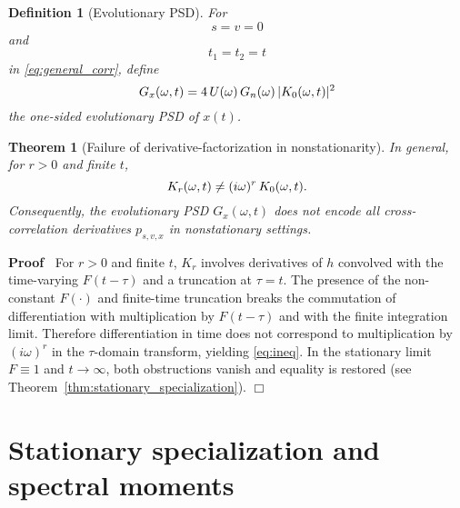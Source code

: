 \documentclass{article}
\newcommand{\cdummy}{\cdot}
\newenvironment{proof}{\noindent\textbf{Proof\ }}{\hspace*{\fill}$\Box$\medskip}
\newtheorem{definition}{Definition}
\newtheorem{theorem}{Theorem}
\begin{document}
\begin{definition}
  [Evolutionary PSD] For
  \begin{equation}
    s = v = 0
  \end{equation}
  and
  \begin{equation}
    t_1 = t_2 = t
  \end{equation}
  in \eqref{eq:general_corr}, define
  \begin{equation}
    \label{eq:evoPSD} G_x (\omega, t) = 4 \hspace{0.17em} U (\omega) 
    \hspace{0.17em} G_n (\omega) \hspace{0.17em} | K_0 (\omega, t) |^2
  \end{equation}
  the one-sided evolutionary PSD of $x (t)$.
\end{definition}

\begin{theorem}
  [Failure of derivative-factorization in
  nonstationarity]\label{thm:fail_factor} In general, for $r > 0$ and finite
  $t$,
  \begin{equation}
    \label{eq:ineq} K_r (\omega, t) \neq (i \omega)^r  \hspace{0.17em} K_0
    (\omega, t) .
  \end{equation}
  Consequently, the evolutionary PSD $G_x (\omega, t)$ does not encode all
  cross-correlation derivatives $p_{s, v, x}$ in nonstationary settings.
\end{theorem}

\begin{proof}
  For $r > 0$ and finite $t$, $K_r$ involves derivatives of $h$ convolved with
  the time-varying $F (t - \tau)$ and a truncation at $\tau = t$. The presence
  of the non-constant $F (\cdummy)$ and finite-time truncation breaks the
  commutation of differentiation with multiplication by $F (t - \tau)$ and
  with the finite integration limit. Therefore differentiation in time does
  not correspond to multiplication by $(i \omega)^r$ in the $\tau$-domain
  transform, yielding \eqref{eq:ineq}. In the stationary limit $F \equiv 1$
  and $t \to \infty$, both obstructions vanish and equality is restored (see
  Theorem~\ref{thm:stationary_specialization}).
\end{proof}

\section{Stationary specialization and spectral moments}
\end{document}
